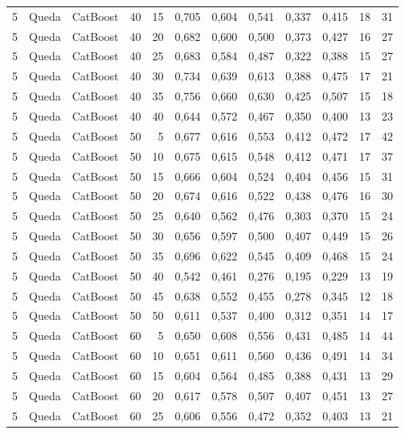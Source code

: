 \begin{longtable}{@{}rllrrrrrrrrr@{}}
5 & Queda & CatBoost & 40 & 15 & 0,705 & 0,604 & 0,541 & 0,337 & 0,415 & 18 & 31 \\
5 & Queda & CatBoost & 40 & 20 & 0,682 & 0,600 & 0,500 & 0,373 & 0,427 & 16 & 27 \\
5 & Queda & CatBoost & 40 & 25 & 0,683 & 0,584 & 0,487 & 0,322 & 0,388 & 15 & 27 \\
5 & Queda & CatBoost & 40 & 30 & 0,734 & 0,639 & 0,613 & 0,388 & 0,475 & 17 & 21 \\
5 & Queda & CatBoost & 40 & 35 & 0,756 & 0,660 & 0,630 & 0,425 & 0,507 & 15 & 18 \\
5 & Queda & CatBoost & 40 & 40 & 0,644 & 0,572 & 0,467 & 0,350 & 0,400 & 13 & 23 \\
5 & Queda & CatBoost & 50 & 5 & 0,677 & 0,616 & 0,553 & 0,412 & 0,472 & 17 & 42 \\
5 & Queda & CatBoost & 50 & 10 & 0,675 & 0,615 & 0,548 & 0,412 & 0,471 & 17 & 37 \\
5 & Queda & CatBoost & 50 & 15 & 0,666 & 0,604 & 0,524 & 0,404 & 0,456 & 15 & 31 \\
5 & Queda & CatBoost & 50 & 20 & 0,674 & 0,616 & 0,522 & 0,438 & 0,476 & 16 & 30 \\
5 & Queda & CatBoost & 50 & 25 & 0,640 & 0,562 & 0,476 & 0,303 & 0,370 & 15 & 24 \\
5 & Queda & CatBoost & 50 & 30 & 0,656 & 0,597 & 0,500 & 0,407 & 0,449 & 15 & 26 \\
5 & Queda & CatBoost & 50 & 35 & 0,696 & 0,622 & 0,545 & 0,409 & 0,468 & 15 & 24 \\
5 & Queda & CatBoost & 50 & 40 & 0,542 & 0,461 & 0,276 & 0,195 & 0,229 & 13 & 19 \\
5 & Queda & CatBoost & 50 & 45 & 0,638 & 0,552 & 0,455 & 0,278 & 0,345 & 12 & 18 \\
5 & Queda & CatBoost & 50 & 50 & 0,611 & 0,537 & 0,400 & 0,312 & 0,351 & 14 & 17 \\
5 & Queda & CatBoost & 60 & 5 & 0,650 & 0,608 & 0,556 & 0,431 & 0,485 & 14 & 44 \\
5 & Queda & CatBoost & 60 & 10 & 0,651 & 0,611 & 0,560 & 0,436 & 0,491 & 14 & 34 \\
5 & Queda & CatBoost & 60 & 15 & 0,604 & 0,564 & 0,485 & 0,388 & 0,431 & 13 & 29 \\
5 & Queda & CatBoost & 60 & 20 & 0,617 & 0,578 & 0,507 & 0,407 & 0,451 & 13 & 27 \\
5 & Queda & CatBoost & 60 & 25 & 0,606 & 0,556 & 0,472 & 0,352 & 0,403 & 13 & 21 \\

\end{longtable}
